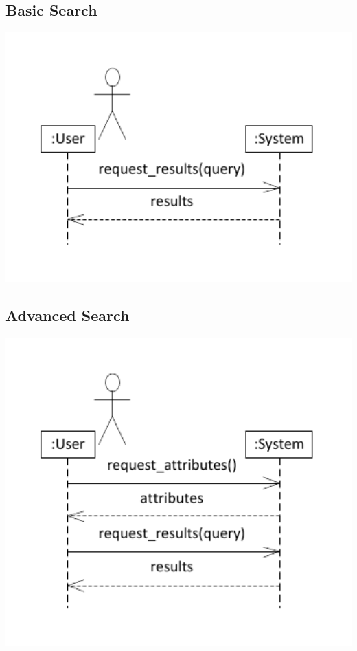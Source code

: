 \documentclass{article}
\begin{document}
\subsection{Basic Search}
\includegraphics[keepaspectratio, width=6in]{ssd_basic_search.pdf}\\
\subsection{Advanced Search}
\includegraphics[keepaspectratio, width=6in]{ssd_advanced_search.pdf}\\
\end{document}
